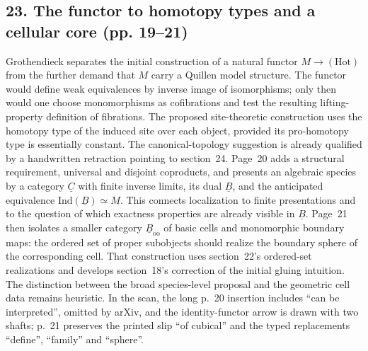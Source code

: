 \documentclass[10pt,oneside]{book}
\begin{document}
\subsection*{23. The functor to homotopy types and a cellular core (pp. 19--21)}
Grothendieck separates the initial construction of a natural functor $M\to(\mathrm{Hot})$ from the further demand that $M$ carry a Quillen model structure. The functor would define weak equivalences by inverse image of isomorphisms; only then would one choose monomorphisms as cofibrations and test the resulting lifting-property definition of fibrations. The proposed site-theoretic construction uses the homotopy type of the induced site over each object, provided its pro-homotopy type is essentially constant. The canonical-topology suggestion is already qualified by a handwritten retraction pointing to section~24. Page~20 adds a structural requirement, universal and disjoint coproducts, and presents an algebraic species by a category $\underline C$ with finite inverse limits, its dual $\underline B$, and the anticipated equivalence $\mathrm{Ind}(\underline B)\simeq M$. This connects localization to finite presentations and to the question of which exactness properties are already visible in $\underline B$. Page~21 then isolates a smaller category $\underline B_{\mathrm{oo}}$ of basic cells and monomorphic boundary maps: the ordered set of proper subobjects should realize the boundary sphere of the corresponding cell. That construction uses section~22's ordered-set realizations and develops section~18's correction of the initial gluing intuition. The distinction between the broad species-level proposal and the geometric cell data remains heuristic. In the scan, the long p.~20 insertion includes ``can be interpreted'', omitted by arXiv, and the identity-functor arrow is drawn with two shafts; p.~21 preserves the printed slip ``of cubical'' and the typed replacements ``define'', ``family'' and ``sphere''.
\end{document}
